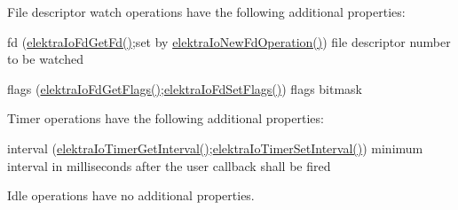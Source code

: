 File descriptor watch operations have the following additional properties\+:
\begin{DoxyItemize}
\item fd (\hyperlink{io_8c_a7dec6afadd09f6350f9ad642906fc88a}{elektra\+Io\+Fd\+Get\+Fd()};set by \hyperlink{io_8c_a3804183da1aecdfcf09455d246c3891c}{elektra\+Io\+New\+Fd\+Operation()}) file descriptor number to be watched
\item flags (\hyperlink{io_8c_a8e2d356be0d89af3e46ebc8ce675db37}{elektra\+Io\+Fd\+Get\+Flags()};\hyperlink{io_8c_a1fd34686b0b3b1db5f460ea8c40ba5a8}{elektra\+Io\+Fd\+Set\+Flags()}) flags bitmask
\end{DoxyItemize}

Timer operations have the following additional properties\+:
\begin{DoxyItemize}
\item interval (\hyperlink{io_8c_abc383110a8cb712a0a35b958b4e446ea}{elektra\+Io\+Timer\+Get\+Interval()};\hyperlink{io_8c_a3e317e4c6e5869f296261c24312507ed}{elektra\+Io\+Timer\+Set\+Interval()}) minimum interval in milliseconds after the user callback shall be fired
\end{DoxyItemize}

Idle operations have no additional properties.

